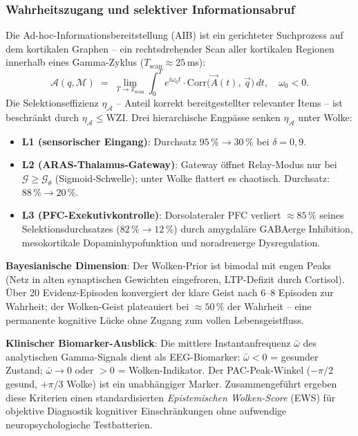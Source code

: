 ﻿\documentclass[a4paper,12pt]{article}
\theoremstyle{definition}
\begin{document}
	\subsubsection{Wahrheitszugang und selektiver Informationsabruf}

	Die Ad-hoc-Informationsbereitstellung (AIB) ist ein gerichteter Suchprozess auf dem kortikalen Graphen -- ein rechtsdrehender Scan aller kortikalen Regionen innerhalb eines Gamma-Zyklus ($T_{\text{scan}} \approx 25$\,ms):
	\[
	\mathcal{A}(q, \mathcal{M}) \;=\; \lim_{T \to T_{\text{scan}}} \int_0^T e^{i\omega_0 t} \cdot \mathrm{Corr}\!\bigl(\vec{A}(t),\, \vec{q}\bigr)\,dt, \quad \omega_0 < 0.
	\]
	Die Selektionseffizienz $\eta_{\mathcal{A}}$ -- Anteil korrekt bereitgestellter relevanter Items -- ist beschränkt durch $\eta_{\mathcal{A}} \leq \mathrm{WZI}$. Drei hierarchische Engpässe senken $\eta_{\mathcal{A}}$ unter Wolke:
	\begin{itemize}
		\item[-] \textbf{L1 (sensorischer Eingang)}: Durchsatz $95\,\% \to 30\,\%$ bei $\delta = 0{,}9$.
		\item[-] \textbf{L2 (ARAS-Thalamus-Gateway)}: Gateway öffnet Relay-Modus nur bei $\mathcal{G} \geq \mathcal{G}_\theta$ (Sigmoid-Schwelle); unter Wolke flattert es chaotisch. Durchsatz: $88\,\% \to 20\,\%$.
		\item[-] \textbf{L3 (PFC-Exekutivkontrolle)}: Dorsolateraler PFC verliert $\approx 85\,\%$ seines Selektionsdurchsatzes ($82\,\% \to 12\,\%$) durch amygdaläre GABAerge Inhibition, mesokortikale Dopaminhypofunktion und noradrenerge Dysregulation.
	\end{itemize}

	\textbf{Bayesianische Dimension}: Der Wolken-Prior ist bimodal mit engen Peaks (Netz in alten synaptischen Gewichten eingefroren, LTP-Defizit durch Cortisol). Über 20 Evidenz-Episoden konvergiert der klare Geist nach $6$--$8$ Episoden zur Wahrheit; der Wolken-Geist plateauiert bei $\approx 50\,\%$ der Wahrheit -- eine permanente kognitive Lücke ohne Zugang zum vollen Lebensgeistfluss.

	\textbf{Klinischer Biomarker-Ausblick}: Die mittlere Instantanfrequenz $\bar{\omega}$ des analytischen Gamma-Signals dient als EEG-Biomarker: $\bar{\omega} < 0$ = gesunder Zustand; $\bar{\omega} \to 0$ oder $> 0$ = Wolken-Indikator. Der PAC-Peak-Winkel ($-\pi/2$ gesund, $+\pi/3$ Wolke) ist ein unabhängiger Marker. Zusammengeführt ergeben diese Kriterien einen standardisierten \emph{Epistemischen Wolken-Score} (EWS) für objektive Diagnostik kognitiver Einschränkungen ohne aufwendige neuropsychologische Testbatterien.
\end{document}
